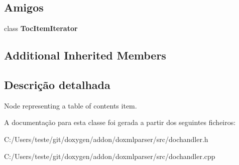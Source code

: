 \subsection*{Amigos}
\begin{DoxyCompactItemize}
\item 
\hypertarget{class_toc_item_handler_a15a328d9d360ffb0a16935e850e64c1b}{class {\bfseries Toc\-Item\-Iterator}}\label{class_toc_item_handler_a15a328d9d360ffb0a16935e850e64c1b}

\end{DoxyCompactItemize}
\subsection*{Additional Inherited Members}


\subsection{Descrição detalhada}
Node representing a table of contents item. 



A documentação para esta classe foi gerada a partir dos seguintes ficheiros\-:\begin{DoxyCompactItemize}
\item 
C\-:/\-Users/teste/git/doxygen/addon/doxmlparser/src/dochandler.\-h\item 
C\-:/\-Users/teste/git/doxygen/addon/doxmlparser/src/dochandler.\-cpp\end{DoxyCompactItemize}
